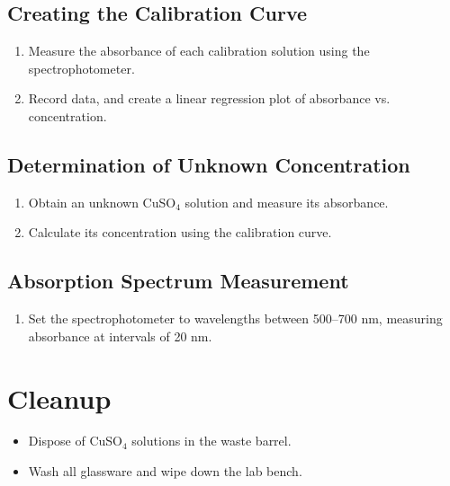 \documentclass{article}
\begin{document}
\subsection*{Creating the Calibration Curve}
\begin{enumerate}
    \item Measure the absorbance of each calibration solution using the spectrophotometer.
    \item Record data, and create a linear regression plot of absorbance vs. concentration.
\end{enumerate}

\subsection*{Determination of Unknown Concentration}
\begin{enumerate}
    \item Obtain an unknown CuSO$_4$ solution and measure its absorbance.
    \item Calculate its concentration using the calibration curve.
\end{enumerate}

\subsection*{Absorption Spectrum Measurement}
\begin{enumerate}
    \item Set the spectrophotometer to wavelengths between 500–700 nm, measuring absorbance at intervals of 20 nm.
\end{enumerate}

\section*{Cleanup}
\begin{itemize}
    \item Dispose of CuSO$_4$ solutions in the waste barrel.
    \item Wash all glassware and wipe down the lab bench.
\end{itemize}
\end{document}
